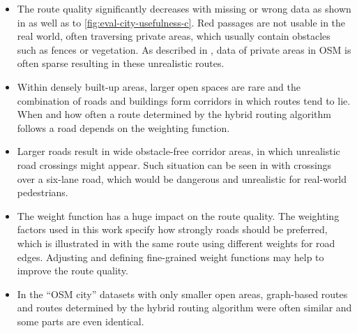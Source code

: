 			\begin{itemize}
				\item The route quality significantly decreases with missing or wrong data as shown in  as well as  to \ref{fig:eval-city-usefulness-c}.
				Red passages are not usable in the real world, often traversing private areas, which usually contain obstacles such as fences or vegetation.
				As described in , data of private areas in OSM is often sparse resulting in these unrealistic routes.
				\item Within densely built-up areas, larger open spaces are rare and the combination of roads and buildings form corridors in which routes tend to lie.
				When and how often a route determined by the hybrid routing algorithm follows a road depends on the weighting function.
				\item Larger roads result in wide obstacle-free corridor areas, in which unrealistic road crossings might appear.
				Such situation can be seen in  with crossings over a six-lane road, which would be dangerous and unrealistic for real-world pedestrians.
				\item The weight function has a huge impact on the route quality.
				The weighting factors used in this work specify how strongly roads should be preferred, which is illustrated in  with the same route using different weights for road edges.
				Adjusting and defining fine-grained weight functions may help to improve the route quality.
				\item In the \enquote{OSM city} datasets with only smaller open areas, graph-based routes and routes determined by the hybrid routing algorithm were often similar and some parts are even identical.
			\end{itemize}
			
